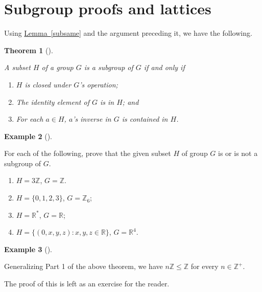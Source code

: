 \documentclass[10pt,]{book}
\theoremstyle{plain}
\newtheorem{theorem}{Theorem}[section]
\theoremstyle{definition}
\theoremstyle{definition}
\theoremstyle{definition}
\newtheorem{example}[theorem]{Example}
\theoremstyle{definition}
\numberwithin{equation}{section}
\def\Z{\mathbb{Z}}
\def\R{\mathbb{R}}
\begin{document}
\section[{Subgroup proofs and lattices}]{Subgroup proofs and lattices}\label{section-14}

    Using \hyperref[subsame]{Lemma~\ref{subsame}} and the argument preceding it, we
    have the following.
\begin{theorem}[{}]\label{subgp}

        A subset \(H\) of a group \(G\) is a subgroup of \(G\) if and only if
        \leavevmode%
\begin{enumerate}
\item\hypertarget{li-195}{}
              \(H\) is closed under \(G\)'s operation;
\item\hypertarget{li-196}{}
              The identity element of \(G\) is in \(H\); and
\item\hypertarget{li-197}{}
              For each \(a\in H\), \(a\)'s inverse in \(G\) is contained in \(H\).
\end{enumerate}

\end{theorem}
\begin{example}[]\label{subsetvsubgp2}

        For each of the following, prove that the given subset \(H\) of group \(G\) is or is not a subgroup of \(G\).
        \leavevmode%
\begin{enumerate}
\item\hypertarget{li-198}{}
              \(H=3\Z\), \(G=\Z\).
\item\hypertarget{li-199}{}
              \(H=\{0,1,2,3\}\), \(G=\Z_6\);
\item\hypertarget{li-200}{}
              \(H=\R^*\), \(G=\R\);
\item\hypertarget{li-201}{}
              \(H=\{(0,x,y,z):x,y,z\in \R\}\), \(G=\R^4\).
\end{enumerate}

\end{example}
\begin{example}[]\label{example-37}

        Generalizing Part 1 of the above theorem, we have \(n\Z\leq \Z\) for every \(n\in \Z^+\).%
\par
 The proof of this is left as an exercise for the reader.
%
\end{example}
\end{document}
